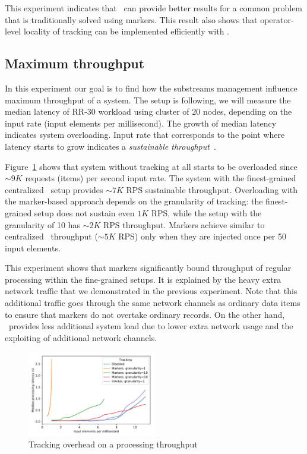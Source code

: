 This experiment indicates that \tracker\ can provide better results for a common problem that is traditionally solved using markers. This result also shows that operator-level locality of tracking can be implemented efficiently with \tracker .

\subsection{Maximum throughput}
In this experiment our goal is to find how the substreams management influence maximum throughput of a system. The setup is following, we will measure the median latency of RR-30 workload using cluster of 20 nodes, depending on the input rate (input elements per millisecond). The growth of median latency indicates system overloading. Input rate that corresponds to the point where latency starts to grow indicates a {\em sustainable throughput}~\cite{karimov2018benchmarking}.

Figure~\ref{throughput_overhead} shows that system without tracking at all starts to be overloaded since $\sim 9K$ requests (items) per second input rate. The system with the finest-grained centralized \tracker\ setup provides $\sim 7K$ RPS sustainable throughput. Overloading with the marker-based approach depends on the granularity of tracking: the finest-grained setup does not sustain even $1K$ RPS, while the setup with the granularity of 10 has $\sim 2K$ RPS throughput. Markers achieve similar to centralized \tracker\ throughput ($\sim 5K$ RPS) only when they are injected once per 50 input elements.

This experiment shows that markers significantly bound throughput of regular processing within the fine-grained setups. It is explained by the heavy extra network traffic that we demonstrated in the previous experiment. Note that this additional traffic goes through the same network channels as ordinary data items to ensure that markers do not overtake ordinary records. On the other hand, \tracker\ provides less additional system load due to lower extra network usage and the exploiting of additional network channels.

\begin{figure}[htbp]
  \centering
  \includegraphics[width=0.50\textwidth]{pics/throughput_overhead_50.pdf}
  \caption{Tracking overhead on a processing throughput}
  \label{throughput_overhead}
\end{figure}

